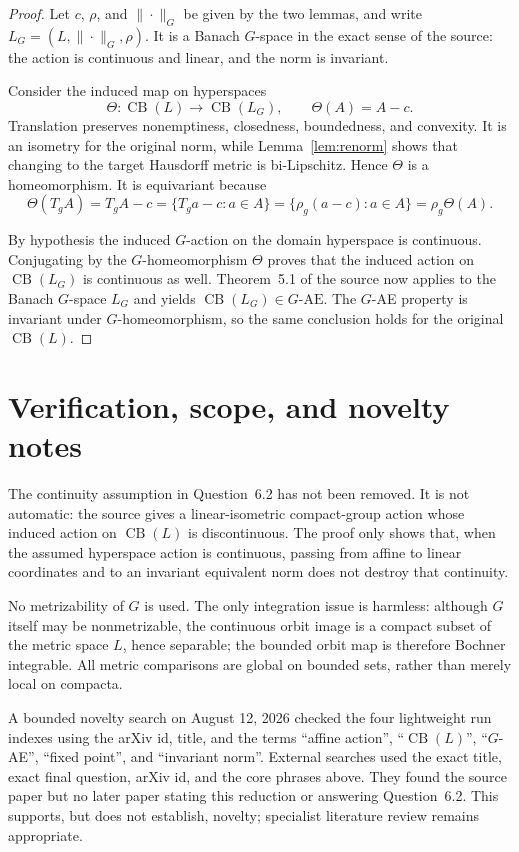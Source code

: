 \documentclass[11pt]{article}
\newcommand{\CB}{\operatorname{CB}}
\begin{document}
\begin{proof}
Let $c$, $\rho$, and $\|\cdot\|_G$ be given by the two lemmas, and write
$L_G=(L,\|\cdot\|_G,\rho)$.  It is a Banach $G$-space in the exact sense of
the source: the action is continuous and linear, and the norm is invariant.

Consider the induced map on hyperspaces
\[
  \Theta:\CB(L)\longrightarrow\CB(L_G),\qquad
  \Theta(A)=A-c.
\]
Translation preserves nonemptiness, closedness, boundedness, and convexity.
It is an isometry for the original norm, while
Lemma~\ref{lem:renorm} shows that changing to the target Hausdorff metric is
bi-Lipschitz.  Hence $\Theta$ is a homeomorphism.  It is equivariant because
\[
  \Theta(T_gA)=T_gA-c
  =\{T_ga-c:a\in A\}
  =\{\rho_g(a-c):a\in A\}
  =\rho_g\Theta(A).
\]

By hypothesis the induced $G$-action on the domain hyperspace is continuous.
Conjugating by the $G$-homeomorphism $\Theta$ proves that the induced action
on $\CB(L_G)$ is continuous as well.  Theorem~5.1 of the source now applies
to the Banach $G$-space $L_G$ and yields
$\CB(L_G)\in G\text{-}\mathrm{AE}$.  The $G$-AE property is invariant under
$G$-homeomorphism, so the same conclusion holds for the original
$\CB(L)$.
\end{proof}

\section{Verification, scope, and novelty notes}

The continuity assumption in Question~6.2 has not been removed.  It is not
automatic: the source gives a linear-isometric compact-group action whose
induced action on $\CB(L)$ is discontinuous.  The proof only shows that, when
the assumed hyperspace action is continuous, passing from affine to linear
coordinates and to an invariant equivalent norm does not destroy that
continuity.

No metrizability of $G$ is used.  The only integration issue is harmless:
although $G$ itself may be nonmetrizable, the continuous orbit image is a
compact subset of the metric space $L$, hence separable; the bounded orbit
map is therefore Bochner integrable.  All metric comparisons are global on
bounded sets, rather than merely local on compacta.

A bounded novelty search on August 12, 2026 checked the four lightweight run
indexes using the arXiv id, title, and the terms ``affine action'',
``$\CB(L)$'', ``$G$-AE'', ``fixed point'', and ``invariant norm''.  External
searches used the exact title, exact final question, arXiv id, and the core
phrases above.  They found the source paper but no later paper stating this
reduction or answering Question~6.2.  This supports, but does not establish,
novelty; specialist literature review remains appropriate.
\end{document}
